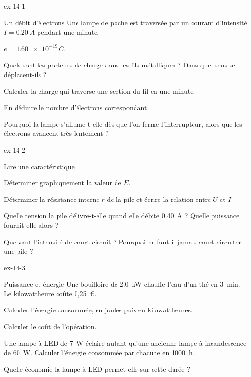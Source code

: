 \begin{blocLivre}{ex-14-1}
\begin{exercice}[1]{Un débit d'électrons}
Une lampe de poche est traversée par un courant d'intensité $I=\qty{0,20}{A}$ pendant une minute.
\begin{donnees}
$e=\qty{1,60e-19}{C}$.
\end{donnees}
\begin{questions}
\item Quels sont les porteurs de charge dans les fils métalliques ? Dans quel sens se déplacent-ils ?
\item Calculer la charge qui traverse une section du fil en une minute.
\item En déduire le nombre d'électrons correspondant.
\item Pourquoi la lampe s'allume-t-elle dès que l'on ferme l'interrupteur, alors que les électrons avancent très lentement ?
\end{questions}
\end{exercice}
\end{blocLivre}
\begin{blocLivre}{ex-14-2}
\begin{exercice}[1]{Lire une caractéristique}
\begin{questions}
\item Déterminer graphiquement la valeur de $E$.
\item Déterminer la résistance interne $r$ de la pile et écrire la relation entre $U$ et $I$.
\item Quelle tension la pile délivre-t-elle quand elle débite \qty{0,40}{A} ? Quelle puissance fournit-elle alors ?
\item Que vaut l'intensité de court-circuit ? Pourquoi ne faut-il jamais court-circuiter une pile ?
\end{questions}
\end{exercice}
\end{blocLivre}
\begin{blocLivre}{ex-14-3}
\begin{exercice}[1]{Puissance et énergie}
Une bouilloire de \qty{2,0}{kW} chauffe l'eau d'un thé en \qty{3}{min}. Le kilowattheure coûte 0,25~€.
\begin{questions}
\item Calculer l'énergie consommée, en joules puis en kilowattheures.
\item Calculer le coût de l'opération.
\item Une lampe à LED de \qty{7}{W} éclaire autant qu'une ancienne lampe à incandescence de \qty{60}{W}. Calculer l'énergie consommée par
chacune en \qty{1000}{h}.
\item Quelle économie la lampe à LED permet-elle sur cette durée ?
\end{questions}
\end{exercice}
\end{blocLivre}

